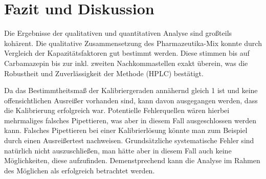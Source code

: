 \section{Fazit und Diskussion}

  Die Ergebnisse der qualitativen und quantitativen Analyse sind großteils kohärent. Die qualitative Zusammensetzung des Pharmazeutika-Mix konnte durch Vergleich der Kapazitätsfaktoren gut bestimmt werden. Diese stimmen bis auf Carbamazepin bis zur inkl. zweiten Nachkommastellen exakt überein, was die Robustheit und Zuverlässigkeit der Methode (HPLC) bestätigt. 
  
  Da das Bestimmtheitsmaß der Kalibriergeraden annähernd gleich 1 ist und keine offensichtlichen Ausreißer vorhanden sind, kann davon ausgegangen werden, dass die Kalibrierung erfolgreich war. Potentielle Fehlerquellen wären hierbei mehrmaliges falsches Pipettieren, was aber in diesem Fall ausgeschlossen werden kann. Falsches Pipettieren bei einer Kalibrierlösung könnte man zum Beispiel durch einen Ausreißertest nachweisen. Grundsätzliche systematische Fehler sind natürlich nicht auszuschließen, man hätte aber in diesem Fall auch keine Möglichkeiten, diese aufzufinden. Demenstprechend kann die Analyse im Rahmen des Möglichen als erfolgreich betrachtet werden.  